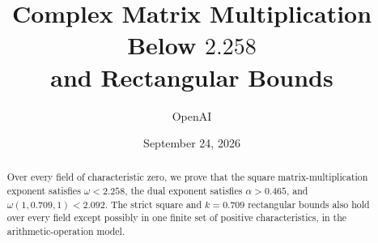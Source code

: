 \documentclass[11pt]{article}
\title{Complex Matrix Multiplication Below \(2.258\)\\and Rectangular Bounds}
\author{OpenAI}
\date{September 24, 2026}
\numberwithin{equation}{section}
\theoremstyle{definition}
\theoremstyle{remark}
\begin{document}
\maketitle
\begin{abstract}
Over every field of characteristic zero, we prove that the square
matrix-multiplication exponent satisfies \(\omega<2.258\), the dual exponent
satisfies \(\alpha>0.465\), and \(\omega(1,0.709,1)<2.092\). The strict
square and \(k=0.709\) rectangular bounds also hold over every field except
possibly in one finite set of positive characteristics, in the
arithmetic-operation model.
\end{abstract}
\tableofcontents













\appendix




\end{document}
